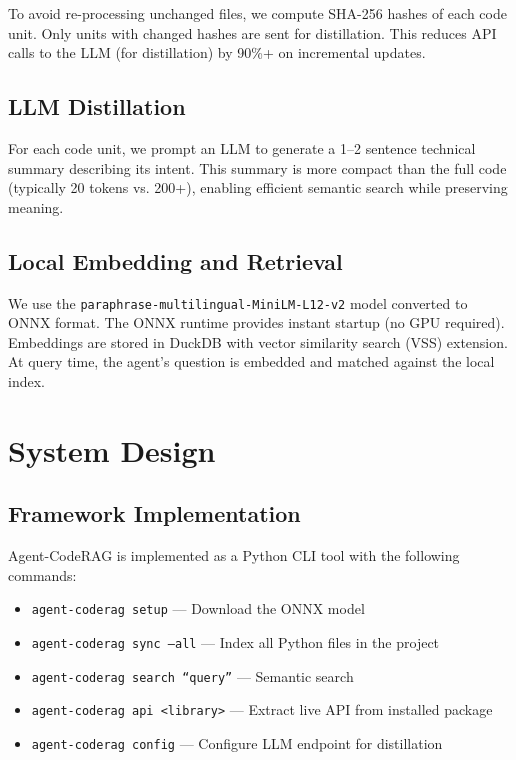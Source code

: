 \documentclass[10pt,twocolumn]{article}
\begin{document}
To avoid re-processing unchanged files, we compute SHA-256 hashes of each code unit. Only units with changed hashes are sent for distillation. This reduces API calls to the LLM (for distillation) by 90\%+ on incremental updates.

\subsection{LLM Distillation}

For each code unit, we prompt an LLM to generate a 1--2 sentence technical summary describing its intent. This summary is more compact than the full code (typically 20 tokens vs. 200+), enabling efficient semantic search while preserving meaning.

\subsection{Local Embedding and Retrieval}

We use the \texttt{paraphrase-multilingual-MiniLM-L12-v2} model converted to ONNX format. The ONNX runtime provides instant startup (no GPU required). Embeddings are stored in DuckDB with vector similarity search (VSS) extension. At query time, the agent's question is embedded and matched against the local index.

\section{System Design}
\label{sec:design}

\subsection{Framework Implementation}

Agent-CodeRAG is implemented as a Python CLI tool with the following commands:
\begin{itemize}
    \item \texttt{agent-coderag setup} — Download the ONNX model
    \item \texttt{agent-coderag sync --all} — Index all Python files in the project
    \item \texttt{agent-coderag search ``query''} — Semantic search
    \item \texttt{agent-coderag api <library>} — Extract live API from installed package
    \item \texttt{agent-coderag config} — Configure LLM endpoint for distillation
\end{itemize}
\end{document}
